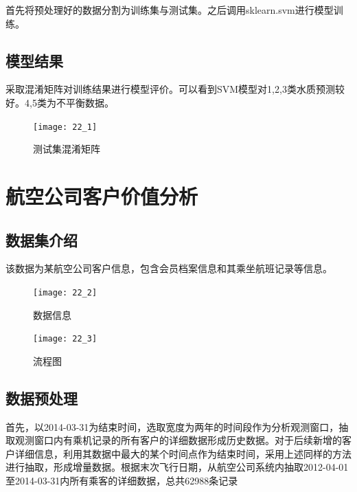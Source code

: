 \documentclass[withoutpreface,bwprint]{cumcmthesis} %
\begin{document}
	\par 首先将预处理好的数据分割为训练集与测试集。之后调用sklearn.svm进行模型训练。
	
	
	
	\subsection{模型结果}
	\par 采取混淆矩阵对训练结果进行模型评价。可以看到SVM模型对1,2,3类水质预测较好。4,5类为不平衡数据。
	
	\begin{figure}[H]
		\centering
		\centerline{\texttt{[image: 22\_1]}}  
		\begin{center}
			\caption{测试集混淆矩阵}
		\end{center}
	\end{figure}
	
	
	
	
	\newpage
	
	\section{航空公司客户价值分析}
	\subsection{数据集介绍}
	\par 该数据为某航空公司客户信息，包含会员档案信息和其乘坐航班记录等信息。
	\begin{figure}[H]
		\centering
		\centerline{\texttt{[image: 22\_2]}}  
		\begin{center}
			\caption{数据信息}
		\end{center}
	\end{figure}
	\begin{figure}[H]
		\centering
		\centerline{\texttt{[image: 22\_3]}}  
		\begin{center}
			\caption{流程图}
		\end{center}
	\end{figure}
	
	\subsection{数据预处理}
	\par 首先，以2014-03-31为结束时间，选取宽度为两年的时间段作为分析观测窗口，抽取观测窗口内有乘机记录的所有客户的详细数据形成历史数据。对于后续新增的客户详细信息，利用其数据中最大的某个时间点作为结束时间，采用上述同样的方法进行抽取，形成增量数据。根据末次飞行日期，从航空公司系统内抽取2012-04-01至2014-03-31内所有乘客的详细数据，总共62988条记录
	
\end{document}
